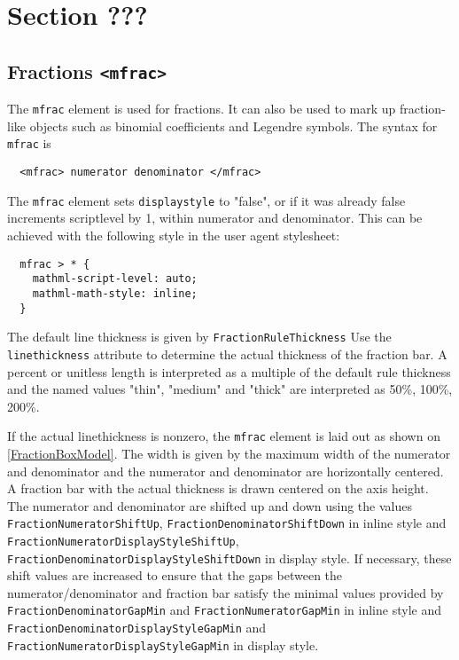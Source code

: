 \section{Section ???}

\subsection{Fractions {\tt <mfrac>}}

The {\tt mfrac} element is used for fractions. It can also be used to mark up
fraction-like objects such as binomial coefficients and Legendre symbols.
The syntax for {\tt mfrac} is

\begin{lstlisting}
  <mfrac> numerator denominator </mfrac>
\end{lstlisting}

The {\tt mfrac} element sets {\tt displaystyle} to "false", or if it was
already false increments scriptlevel by 1, within numerator and denominator.
This can be achieved with the following style in the user agent stylesheet:

\begin{lstlisting}
  mfrac > * {
    mathml-script-level: auto;
    mathml-math-style: inline;
  }
\end{lstlisting}

The default line thickness is given by {\tt FractionRuleThickness}
Use the {\tt linethickness} attribute \cite{MathML3} to determine the
actual thickness of the fraction bar. A percent or unitless length is
interpreted as a multiple of the default rule thickness and
the named values "thin", "medium" and "thick" are interpreted as
50\%, 100\%, 200\%.

If the actual linethickness is nonzero, the {\tt mfrac} element is laid out as
shown on \ref{FractionBoxModel}. The width is given by the maximum width of the
numerator and denominator and the numerator and denominator are horizontally
centered. A fraction bar with the actual thickness is drawn centered on the
axis height. The numerator and denominator are shifted
up and down using the values {\tt FractionNumeratorShiftUp},
{\tt FractionDenominatorShiftDown} in inline style and
{\tt FractionNumeratorDisplayStyleShiftUp},
{\tt FractionDenominatorDisplayStyleShiftDown} in display style.
If necessary, these shift values are increased to ensure that the gaps between
the numerator/denominator and fraction bar satisfy the minimal values provided
by {\tt FractionDenominatorGapMin} and
{\tt FractionNumeratorGapMin} in inline style and
{\tt FractionDenominatorDisplayStyleGapMin} and
{\tt FractionNumeratorDisplayStyleGapMin} in display style.

